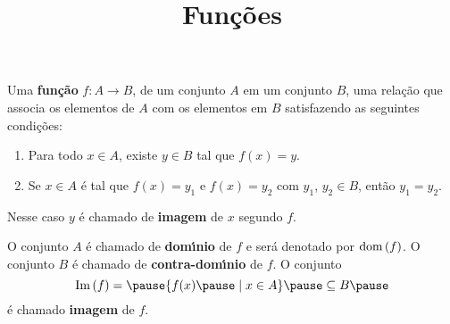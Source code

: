 \documentclass{beamer}
\title{Fun\c{c}\~oes}
\author[\autor]{\autor}
\institute[\instituto]{\instituto}
\date{}
\begin{document}
    \begin{frame}
        \maketitle
    \end{frame}


    \begin{frame}
        \begin{definicao}
            Uma \textbf{fun{\c c}{\~a}o} \pause $f : A \to B$, \pause de um conjunto $A$ \pause em um conjunto $B$,  uma rela{\c c}{\~a}o que associa os elementos de $A$ \pause com os elementos em $B$ \pause satisfazendo as seguintes condi\c{c}\~oes:\pause
            \begin{enumerate}[label={\roman*})]
                \item Para todo $x \in A$, \pause existe $y \in B$ \pause tal que $f(x) = y$.\pause

                \vspace{.3cm}

                \item  Se $x \in A$ \pause \'e tal que $f(x) = y_1$ \pause e $f(x) = y_2$ \pause com $y_1$, \pause $y_2 \in B$, \pause ent\~ao $y_1 = y_2$.\pause
            \end{enumerate}
            Nesse caso $y$ \'e chamado de \textbf{imagem} \pause de $x$ segundo $f$.\pause
        \end{definicao}

        O conjunto $A$ {\'e} chamado de \textbf{dom{\'\i}nio} \pause de $f$ \pause e ser\'a denotado por ${\rm dom\,}(f)$. \pause O conjunto $B$ {\'e} chamado de \textbf{contra-dom{\'\i}nio} \pause de $f$. \pause O conjunto\pause
        \[
            \im(f) = \pause \{f(x) \pause \mid x \in A\} \pause \sub B\pause
        \]
        \'e chamado \textbf{imagem} de $f$.\pause
    \end{frame}
\end{document}
